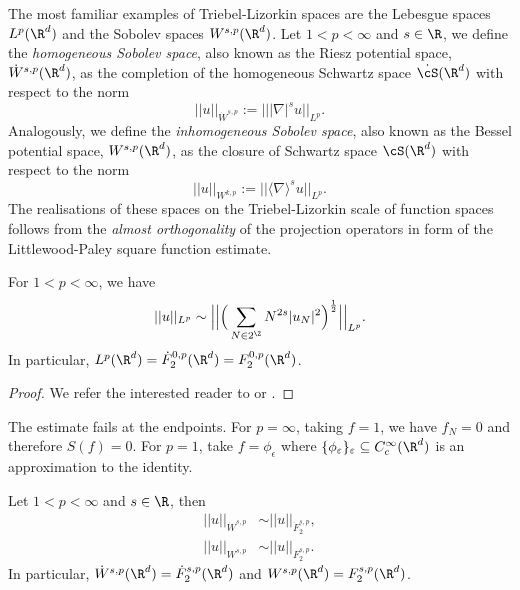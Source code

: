 The most familiar examples of Triebel-Lizorkin spaces are the Lebesgue spaces $L^p (\R^d)$ and the Sobolev spaces $W^{s, p} (\R^d)$. Let $1 < p < \infty$ and $s \in \R$, we define the \emph{homogeneous Sobolev space}, also known as the Riesz potential space, $\dot W^{s, p} (\R^d)$, as the completion of the homogeneous Schwartz space $\dot \cS (\R^d)$ with respect to the norm 
	\[ ||u||_{\dot W^{s, p}} := |||\nabla|^s u||_{L^p}. \]
Analogously, we define the \emph{inhomogeneous Sobolev space}, also known as the Bessel potential space, $W^{s, p} (\R^d)$, as the closure of Schwartz space $\cS (\R^d)$ with respect to the norm 
	\[ ||u||_{W^{k, p}} := ||\langle \nabla \rangle^s u||_{L^p}. \]
The realisations of these spaces on the Triebel-Lizorkin scale of function spaces follows from the \textit{almost orthogonality} of the projection operators in form of the Littlewood-Paley square function estimate. 	

\begin{lemma}
\label{thm:square}
	For $1 < p < \infty$, we have
		\[ || u||_{L^p} \sim  \Big|\Big| \Big( \sum_{N \in 2^\Z} N^{2s} |u_N|^2 \Big)^\frac12 \Big|\Big|_{L^p}. \]
	In particular, $L^p (\R^d) = \dot F^{0, p}_2 (\R^d) = F^{0, p}_2 (\R^d)$. 	
\end{lemma}

\begin{proof}
	We refer the interested reader to \cite[Chapter IV]{Stein1970} or \cite[Theorem 8.4]{Duoandikoetxea2001}. 
\end{proof}

\begin{remark}
	The estimate fails at the endpoints. For $p = \infty$, taking $f = 1$, we have $f_N = 0$ and therefore $S(f) = 0$. For $p = 1$, take $f = \phi_\epsilon$ where $\{\phi_\epsilon\}_\epsilon \subseteq C^\infty_c (\R^d)$ is an approximation to the identity. 
\end{remark}

\begin{theorem}
	Let $1 < p < \infty$ and $s \in \R$, then 
		\begin{align*}
			 || u ||_{\dot W^{s, p}} 
			 	&\sim ||u||_{\dot F^{s, p}_2},\\
			 || u ||_{W^{s, p}} 
			 	&\sim ||u||_{F^{s, p}_2}.
		\end{align*}	 
	In particular, $\dot W^{s, p} (\R^d) = \dot F^{s, p}_2 (\R^d)$ and $W^{s, p} (\R^d) = F^{s, p}_2 (\R^d)$. 
\end{theorem}


